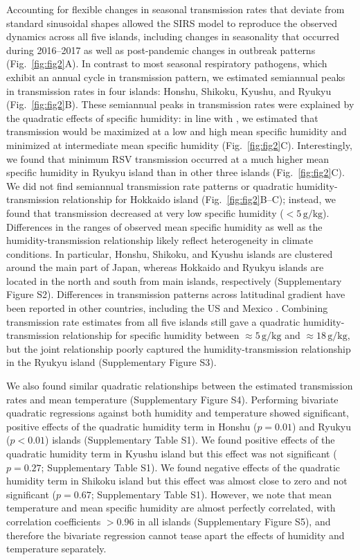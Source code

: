 \documentclass[12pt]{article}
\newcommand{\fref}[1]{Fig.~\ref{fig:#1}}
\begin{document}
Accounting for flexible changes in seasonal transmission rates that deviate from standard sinusoidal shapes allowed the SIRS model to reproduce the observed dynamics across all five islands, including changes in seasonality that occurred during 2016--2017 as well as post-pandemic changes in outbreak patterns (\fref{fig2}A).
In contrast to most seasonal respiratory pathogens, which exhibit an annual cycle in transmission pattern, we estimated semiannual peaks in transmission rates in four islands: Honshu, Shikoku, Kyushu, and Ryukyu (\fref{fig2}B).
These semiannual peaks in transmission rates were explained by the quadratic effects of specific humidity:
in line with \cite{baker2019epidemic}, we estimated that transmission would be maximized at a low and high mean specific humidity and minimized at intermediate mean specific humidity (\fref{fig2}C).
Interestingly, we found that minimum RSV transmission occurred at a much higher mean specific humidity in Ryukyu island than in other three islands (\fref{fig2}C).
We did not find semiannual transmission rate patterns or quadratic humidity-transmission relationship for Hokkaido island (\fref{fig2}B--C);
instead, we found that transmission decreased at very low specific humidity ($<5\,\mathrm{g/kg}$).
Differences in the ranges of observed mean specific humidity as well as the humidity-transmission relationship likely reflect heterogeneity in climate conditions.
In particular, Honshu, Shikoku, and Kyushu islands are clustered around the main part of Japan, whereas Hokkaido and Ryukyu islands are located in the north and south from main islands, respectively (Supplementary Figure S2).
Differences in transmission patterns across latitudinal gradient have been reported in other countries, including the US and Mexico \citep{baker2019epidemic}.
Combining transmission rate estimates from all five islands still gave a quadratic humidity-transmission relationship for specific humidity between $\approx 5\,\mathrm{g/kg}$ and $\approx18\,\mathrm{g/kg}$, but the joint relationship poorly captured the humidity-transmission relationship in the Ryukyu island (Supplementary Figure S3).

We also found similar quadratic relationships between the estimated transmission rates and mean temperature (Supplementary Figure S4).
Performing bivariate quadratic regressions against both humidity and temperature showed significant, positive effects of the quadratic humidity term in Honshu ($p=0.01$) and Ryukyu ($p<0.01$) islands (Supplementary Table S1).
We found positive effects of the quadratic humidity term in Kyushu island but this effect was not significant ($p=0.27$; Supplementary Table S1).
We found negative effects of the quadratic humidity term in Shikoku island but this effect was almost close to zero and not significant ($p=0.67$; Supplementary Table S1).
However, we note that mean temperature and mean specific humidity are almost perfectly correlated, with correlation coefficients $>0.96$ in all islands (Supplementary Figure S5), and therefore the bivariate regression cannot tease apart the effects of humidity and temperature separately.
\end{document}
